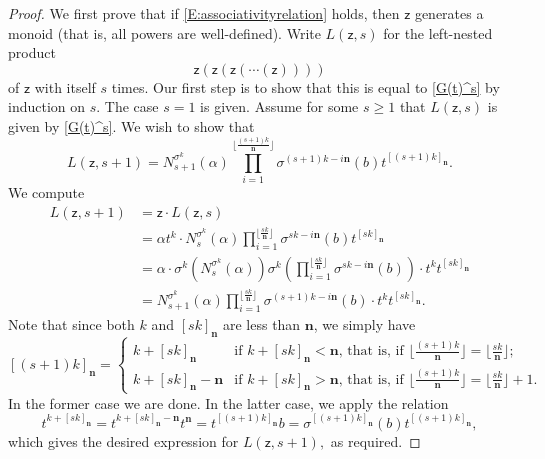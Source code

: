 \documentclass[10pt,a4paper]{amsart}
\newcommand{\de}{\mathbf{n}}  %
\newcommand{\scz}{\mathsf{z}}  %
\begin{document}
\begin{proof}
We first prove that if \eqref{E:associativityrelation} holds, then $\scz$ generates a monoid (that is, all powers are well-defined).
    Write $L(\scz,s)$ for the left-nested product
    $$
    \scz(\scz(\scz( \cdots (\scz))))
    $$
    of $\scz$ with itself $s$ times.
    Our first step is to show that this is equal to \eqref{G(t)^s} by induction on $s$.  The case $s=1$ is given.  Assume for some $s\geq 1$ that $L(\scz,s)$ is given by \eqref{G(t)^s}.  We wish to show that
    \begin{equation}\label{E:Lzs+1}
    L(\scz,s+1)= N_{s+1}^{\sigma^k}(\alpha)\prod_{i=1}^{\lfloor \frac{(s+1)k}{\de}\rfloor} \sigma^{(s+1)k-i\de}(b)t^{[(s+1)k]_{\de}}.
    \end{equation}
    We compute
    \begin{align*}
    L(\scz,s+1) &= \scz \cdot L(\scz,s)\\
    &=\alpha t^k \cdot N_{s}^{\sigma^k}(\alpha)\prod_{i=1}^{\lfloor \frac{sk}{\de}\rfloor} \sigma^{sk-i\de}(b)t^{[sk]_{\de}} \\
    &= \alpha \cdot \sigma^k\left( N_{s}^{\sigma^k}(\alpha)\right) \sigma^k\left(\prod_{i=1}^{\lfloor \frac{sk}{\de}\rfloor} \sigma^{sk-i\de}(b)\right)\cdot t^kt^{[sk]_{\de}}\\
    &= N_{s+1}^{\sigma^k}(\alpha) \prod_{i=1}^{\lfloor \frac{sk}{\de}\rfloor} \sigma^{(s+1)k-i\de}(b)\cdot t^kt^{[sk]_{\de}}.
    \end{align*}
    Note that since both $k$ and $[sk]_{\de}$ are less than $\de$, we simply have
    $$
    [(s+1)k]_{\de} = \begin{cases}
        k+[sk]_{\de} & \text{if $k+[sk]_{\de}<\de$, that is, if $\lfloor \frac{(s+1)k}{\de}\rfloor=\lfloor \frac{sk}{\de}\rfloor$};\\
        k+[sk]_{\de}-\de & \text{if $k+[sk]_{\de} > \de$, that is, if $\lfloor \frac{(s+1)k}{\de}\rfloor=\lfloor \frac{sk}{\de}\rfloor+1$.}
    \end{cases}
    $$
    In the former case we are done.  In the latter case, we apply the relation
    $$
    t^{k+[sk]_{\de}} = t^{k+[sk]_{\de}-\de}t^{\de}= t^{[(s+1)k]_{\de}}b=\sigma^{[(s+1)k]_{\de}}(b)t^{[(s+1)k]_{\de}},
    $$
    which gives the desired expression for $L(\scz,s+1),$  as required.


\end{proof}
\end{document}
